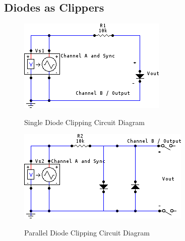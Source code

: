 \documentclass[twocolumn,english]{IEEEtran}
\begin{document}
\subsection{Diodes as Clippers}
\begin{figure}[h]
  \begin{centering}
  \begin{center}
  \includegraphics[width=\linewidth]{./1.png}
  \label{fig:circuit_1a}
  \caption{Single Diode Clipping Circuit Diagram}
  \end{center}
  \par\end{centering}
  \end{figure}

  \begin{figure}[h]
  \begin{centering}
  \begin{center}
  \includegraphics[width=\linewidth]{./2.png}
  \label{fig:circuit_1b}
  \caption{Parallel Diode Clipping Circuit Diagram}
  \end{center}
  \par\end{centering}
  \end{figure}
\end{document}
